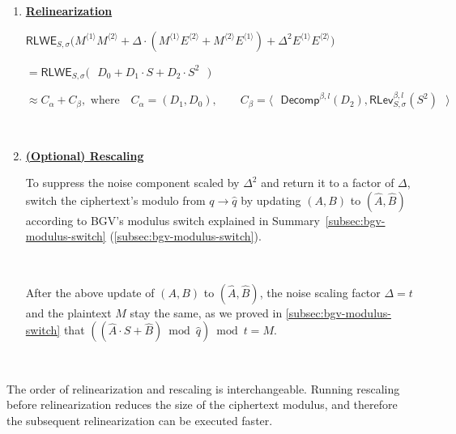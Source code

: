 \begin{tcolorbox}[title={\textbf{\tboxlabel{\ref*{subsec:bgv-mult-cipher}} BGV Ciphertext-to-Ciphertext Multiplication}}]
\begin{enumerate}
$= D_0 + D_1\cdot S + D_2 \cdot S^2$

$ $

\item \textbf{\underline{Relinearization}} 

$\textsf{RLWE}_{S, \sigma}\bm(M^{\langle 1 \rangle}M^{\langle 2 \rangle} + \Delta\cdot (M^{\langle 1 \rangle}E^{\langle 2 \rangle} + M^{\langle 2 \rangle}E^{\langle 1 \rangle}) + \Delta^2E^{\langle 1 \rangle}E^{\langle 2 \rangle}\bm) $

$= \textsf{RLWE}_{S, \sigma}\bm{(}\text{ }D_0 + D_1\cdot S + D_2\cdot S^2\text{ }\bm{)}$

$  \approx C_\alpha + C_\beta, \text{ where } \text{ } C_\alpha = (D_1, D_0), \text{ }\text{ }\text{ } C_\beta = \bm{\langle}  \text{ } \textsf{Decomp}^{\beta, l}(D_2), \textsf{RLev}_{S, \sigma}^{\beta, l}(S^2)  \text{ } \bm{\rangle}$ 

$ $

\item \textbf{\underline{(Optional) Rescaling}}

To suppress the noise component scaled by $\Delta^2$ and return it to a factor of $\Delta$, switch the ciphertext's modulo from $q \rightarrow \hat q$ by updating $(A, B)$ to $(\hat A, \hat B)$ according to BGV's modulus switch explained in Summary~\ref*{subsec:bgv-modulus-switch} (\autoref{subsec:bgv-modulus-switch}).

$ $

After the above update of $(A, B)$ to $(\hat A, \hat B)$, the noise scaling factor $\Delta = t$ and the plaintext $M$ stay the same, as we proved in \autoref{subsec:bgv-modulus-switch} that $((\hat A \cdot S + \hat B) \bmod \hat q) \bmod t = M$.

$ $



\end{enumerate}

 The order of relinearization and rescaling is interchangeable. Running rescaling before relinearization reduces the size of the ciphertext modulus, and therefore the subsequent relinearization can be executed faster. 

\end{tcolorbox}

